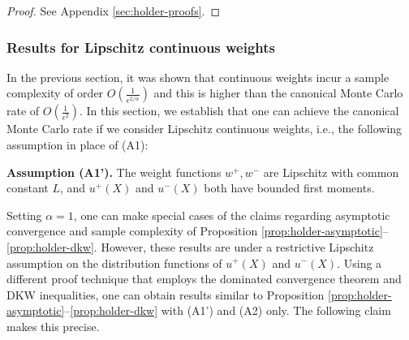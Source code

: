 \begin{proof}

%

See Appendix \ref{sec:holder-proofs}.
\end{proof}

\subsubsection{Results for Lipschitz continuous weights}
In the previous section, it was shown that \holder continuous weights incur a sample complexity of order $O\left(\frac1{\epsilon^{2/\alpha}}\right)$ and this is higher than the canonical Monte Carlo rate of $O\left(\frac1{\epsilon^2}\right)$. In this section, we establish that one can achieve the canonical Monte Carlo rate if we consider Lipschitz continuous weights, i.e., the following assumption in place of (A1):
 
\textbf{Assumption (A1').}  The weight functions $w^+, w^-$ are Lipschitz with common constant $L$, and 
$u^+(X)$ and $u^-(X)$ both have bounded first moments.

Setting $\alpha=1$, one can make special cases of the claims regarding asymptotic convergence and sample complexity of Proposition \ref{prop:holder-asymptotic}--\ref{prop:holder-dkw}. However, these results are under  a restrictive Lipschitz assumption on the distribution functions of $u^+(X)$ and $u^-(X)$. Using a different proof technique that employs the dominated convergence theorem and DKW inequalities, one can obtain results similar to Proposition \ref{prop:holder-asymptotic}--\ref{prop:holder-dkw} with (A1') and (A2) only. The following claim makes this precise.

